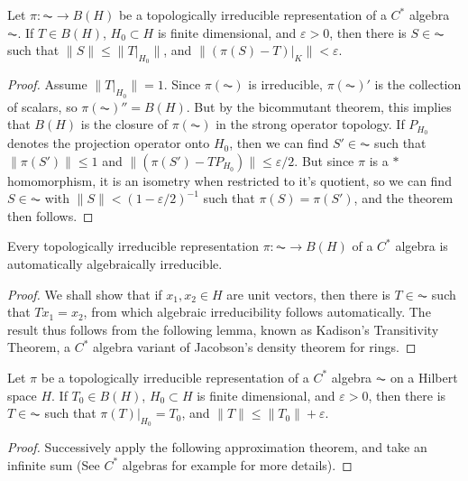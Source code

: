 \begin{theorem}
    Let $\pi: \AC \to B(H)$ be a topologically irreducible representation of a $C^*$ algebra $\AC$. If $T \in B(H)$, $H_0 \subset H$ is finite dimensional, and $\varepsilon > 0$, then there is $S \in \AC$ such that $\| S \| \leq \| T|_{H_0} \|$, and $\| (\pi(S) - T)|_K \| < \varepsilon$.
\end{theorem}
\begin{proof}
    Assume $\| T|_{H_0} \| = 1$. Since $\pi(\AC)$ is irreducible, $\pi(\AC)'$ is the collection of scalars, so $\pi(\AC)'' = B(H)$. But by the bicommutant theorem, this implies that $B(H)$ is the closure of $\pi(\AC)$ in the strong operator topology. If $P_{H_0}$ denotes the projection operator onto $H_0$, then we can find $S' \in \AC$ such that $\| \pi(S') \| \leq 1$ and $\| (\pi(S') - T P_{H_0}) \| \leq \varepsilon / 2$. But since $\pi$ is a $*$ homomorphism, it is an isometry when restricted to it's quotient, so we can find $S \in \AC$ with $\| S \| < (1 - \varepsilon / 2)^{-1}$ such that $\pi(S) = \pi(S')$, and the theorem then follows.
\end{proof}

\begin{theorem}
    Every topologically irreducible representation $\pi: \AC \to B(H)$ of a $C^*$ algebra is automatically algebraically irreducible.
\end{theorem}
\begin{proof}
    We shall show that if $x_1,x_2 \in H$ are unit vectors, then there is $T \in \AC$ such that $Tx_1 = x_2$, from which algebraic irreducibility follows automatically. The result thus follows from the following lemma, known as Kadison's Transitivity Theorem, a $C^*$ algebra variant of Jacobson's density theorem for rings.
\end{proof}

\begin{theorem}
    Let $\pi$ be a topologically irreducible representation of a $C^*$ algebra $\AC$ on a Hilbert space $H$. If $T_0 \in B(H)$, $H_0 \subset H$ is finite dimensional, and $\varepsilon > 0$, then there is $T \in \AC$ such that $\pi(T)|_{H_0} = T_0$, and $\| T \| \leq \| T_0 \| + \varepsilon$.
\end{theorem}
\begin{proof}
    Successively apply the following approximation theorem, and take an infinite sum (See $C^*$ algebras for example for more details).
\end{proof}







